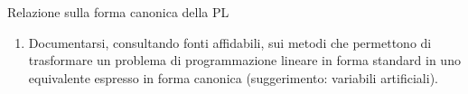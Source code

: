 \documentclass{beamer}
\begin{document}
\generatitolo


\begin{frame}{Relazione sulla forma canonica della PL}

    \begin{enumerate}
    
     \item Documentarsi, consultando fonti affidabili, sui metodi
     che permettono di trasformare un problema di programmazione
     lineare in forma standard in uno equivalente espresso in
     forma canonica (suggerimento: variabili artificiali).
    \end{enumerate}
\end{frame}
\end{document}

